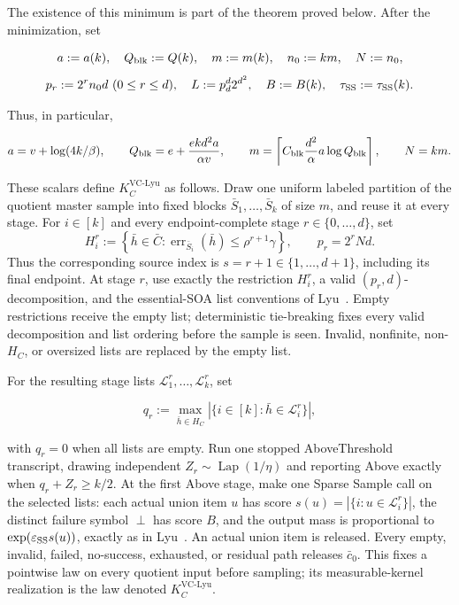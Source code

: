 The existence of this minimum is part of the theorem proved below.  After
the minimization, set

\[
 a:=a(k),\quad Q_{\rm blk}:=Q(k),\quad
 m:=m(k),\quad n_0:=km,\quad N:=n_0,
\]
\[
 p_r:=2^rn_0d\ (0\le r\le d),\quad
 L:=p_d^d2^{d^2},\quad B:=B(k),\quad
 \tau_{\rm SS}:=\tau_{\rm SS}(k).
\]

Thus, in particular,

\[
 a=v+\log(4k/\beta),\qquad
 Q_{\rm blk}=e+\frac{ekd^2a}{\alpha v},\qquad
 m=\left\lceil C_{\rm blk}\frac{d^2}{\alpha}
 a\log Q_{\rm blk}\right\rceil,\qquad N=km.
\]

These scalars define $K_C^{\mathrm{VC\text{-}Lyu}}$ as follows.  Draw one
uniform labeled partition of the quotient master sample into fixed blocks
$\bar S_1,\ldots,\bar S_k$ of size $m$, and reuse it at every stage.  For
$i\in[k]$ and every endpoint-complete stage $r\in\{0,\ldots,d\}$, set
\[
 H_i^r:=\left\{\bar h\in\bar C:
 \operatorname{err}_{\bar S_i}(\bar h)
 \le\rho^{r+1}\gamma\right\},
 \qquad p_r=2^rNd.
\]
Thus the corresponding source index is
$s=r+1\in\{1,\ldots,d+1\}$, including its final endpoint.  At stage
$r$, use exactly the restriction $H_i^r$, a valid
$(p_r,d)$-decomposition, and the essential-SOA list conventions of
Lyu~\citep[Definitions~4.2--4.3, Lemmas~4.1 and~4.3, Corollary~4.1,
and the construction in Theorem~3]{lyu2025}.  Empty restrictions receive
the empty list; deterministic tie-breaking fixes every valid decomposition
and list ordering before the sample is seen.  Invalid, nonfinite,
non-$H_C$, or oversized lists are replaced by the empty list.

For the resulting stage lists $\mathcal L_1^r,\ldots,\mathcal L_k^r$, set

\[
 q_r:=\max_{\bar h\in H_C}
 |\{i\in[k]:\bar h\in\mathcal L_i^r\}|,
\]

with $q_r=0$ when all lists are empty.  Run one stopped AboveThreshold
transcript, drawing independent $Z_r\sim\operatorname{Lap}(1/\eta)$ and
reporting Above exactly when $q_r+Z_r\ge k/2$.  At the first Above stage,
make one Sparse Sample call on the selected lists: each actual union item
$u$ has score $s(u)=|\{i:u\in\mathcal L_i^r\}|$, the distinct failure
symbol $\perp$ has score $B$, and the output mass is proportional to
$\exp(\varepsilon_{\rm SS}s(u))$, exactly as in
Lyu~\citep[Algorithm~1 and Lemma~3.1]{lyu2025}.  An actual union item is
released.  Every empty, invalid, failed, no-success, exhausted, or residual
path releases $\bar c_0$.  This fixes a pointwise law on every quotient
input before sampling; its measurable-kernel realization is the law denoted
$K_C^{\mathrm{VC\text{-}Lyu}}$.

